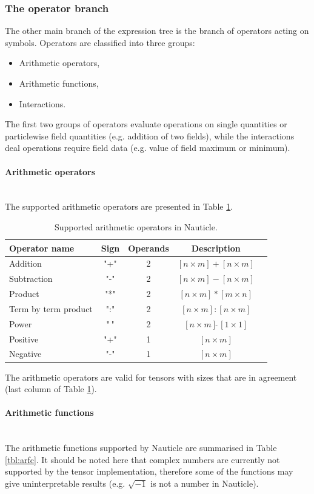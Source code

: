 \documentclass[a4paper,12pt,openany]{book}
\newcommand{\myparagraph}[1]{\paragraph{#1}\mbox{}\\}
\theoremstyle{break}
\begin{document}
\subsubsection{The operator branch}
The other main branch of the expression tree is the branch of operators acting on symbols. Operators are classified into three groups:
\begin{itemize}
  \item Arithmetic operators,
  \item Arithmetic functions,
  \item Interactions.
\end{itemize}
The first two groups of operators evaluate operations on single quantities or particlewise field quantities (e.g. addition of two fields), while the interactions deal operations require field data (e.g. value of field maximum or minimum).
\myparagraph{Arithmetic operators}
The supported arithmetic operators are presented in Table \ref{tbl:arop}.
\begin{table}
\begin{center}
\caption{Supported arithmetic operators in Nauticle.}\label{tbl:arop}
\begin{tabular}{ l c c c c }
\toprule[1.5pt]
\bf Operator name & \bf Sign & \bf Operands & \bf Description\\ 
\midrule
Addition & "+" & 2 & $[n \times m] + [n \times m]$\\ 
Subtraction & "-" & 2 & $[n \times m] - [n \times m]$\\ 
Product & "*" & 2 & $[n \times m] * [m \times n]$\\ 
Term by term product & ":" & 2 & $[n \times m] : [n \times m]$\\ 
Power & "$\hat{\ }$" & 2 & $[n \times m] \hat{\ } [1 \times 1]$\\ 
Positive & "+" & 1 & $[n \times m]$\\ 
Negative & "-" & 1 & $[n \times m]$\\ 
\bottomrule[1.25pt]
\end{tabular}
\end{center}
\end{table}
The arithmetic operators are valid for tensors with sizes that are in agreement (last column of Table \ref{tbl:arop}).
\myparagraph{Arithmetic functions}
The arithmetic functions supported by Nauticle are summarised in Table \ref{tbl:arfc}. It should be noted here that complex numbers are currently not supported by the tensor implementation, therefore some of the functions may give uninterpretable results (e.g. $\sqrt{-1}$ is not a number in Nauticle).
\end{document}
